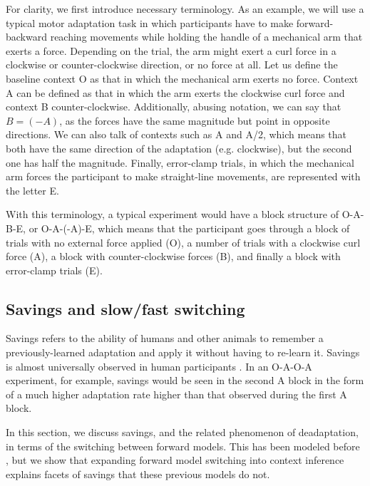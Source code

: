 \documentclass[a4paper,doc,floatsintext,natbib]{apa6}
\begin{document}
For clarity, we first introduce necessary terminology. As an example, we will use a typical motor adaptation task in which participants have to make forward-backward reaching movements while holding the handle of a mechanical arm that exerts a force. Depending on the trial, the arm might exert a curl force in a clockwise or counter-clockwise direction, or no force at all. Let us define the baseline context O as that in which the mechanical arm exerts no force. Context A can be defined as that in which the arm exerts the clockwise curl force and context B counter-clockwise. Additionally, abusing notation, we can say that $B = (-A)$, as the forces have the same magnitude but point in opposite directions. We can also talk of contexts such as A and A/2, which means that both have the same direction of the adaptation (e.g. clockwise), but the second one has half the magnitude. Finally, error-clamp trials, in which the mechanical arm forces the participant to make straight-line movements, are represented with the letter E.

With this terminology, a typical experiment \cite[e.g.][]{Ethier_Spontaneous_2008} would have a block structure of O-A-B-E, or O-A-(-A)-E, which means that the participant goes through a block of trials with no external force applied (O), a number of trials with a clockwise curl force (A), a block with counter-clockwise forces (B), and finally a block with error-clamp trials (E).

\subsection{Savings and slow/fast switching}
Savings refers to the ability of humans and other animals to remember a previously-learned adaptation and apply it without having to re-learn it. Savings is almost universally observed in human participants \cite{Brashers-Krug_Consolidation_1996,Shadmehr_Functional_1997,Medina_Mechanism_2001,Smith_Interacting_2006,Zarahn_Explaining_2008}. In an O-A-O-A experiment, for example, savings would be seen in the second A block in the form of a much higher adaptation rate higher than that observed during the first A block.

In this section, we discuss savings, and the related phenomenon of deadaptation, in terms of the switching between forward models. This has been modeled before \citep[e.g.][]{Wolpert_Multiple_1998,Oh_Minimizing_2019}, but we show that expanding forward model switching into context inference explains facets of savings that these previous models do not.
\end{document}

